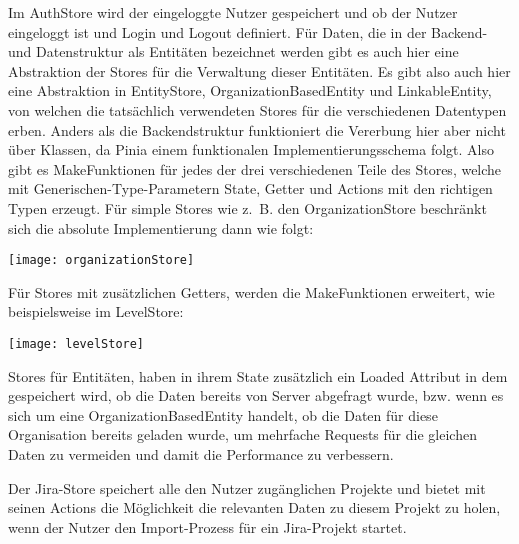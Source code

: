 Im AuthStore wird der eingeloggte Nutzer gespeichert und ob der Nutzer eingeloggt ist und Login und Logout definiert.
Für Daten, die in der Backend- und Datenstruktur als Entitäten bezeichnet werden gibt es auch hier eine Abstraktion der Stores für die Verwaltung dieser Entitäten. Es gibt also auch hier eine Abstraktion in EntityStore, OrganizationBasedEntity und LinkableEntity, von welchen die tatsächlich verwendeten Stores für die verschiedenen Datentypen erben. Anders als die Backendstruktur funktioniert die Vererbung hier aber nicht über Klassen, da Pinia einem funktionalen Implementierungsschema folgt. Also gibt es MakeFunktionen für jedes der drei verschiedenen Teile des Stores, welche mit Generischen-Type-Parametern State, Getter und Actions mit den richtigen Typen erzeugt. Für simple Stores wie z. B. den OrganizationStore beschränkt sich die absolute Implementierung dann wie folgt:

\vspace{20pt}
\begin{center}
    \begin{minipage}{1\linewidth}
        \texttt{[image: organizationStore]}
    \end{minipage}
\end{center}
\vspace{20pt}

Für Stores mit zusätzlichen Getters, werden die MakeFunktionen erweitert, wie beispielsweise im LevelStore:

\vspace{20pt}
\begin{center}
    \begin{minipage}{1\linewidth}
        \texttt{[image: levelStore]}
    \end{minipage}
\end{center}
\vspace{20pt}

Stores für Entitäten, haben in ihrem State zusätzlich ein Loaded Attribut in dem gespeichert wird, ob die Daten bereits von Server abgefragt wurde, bzw. wenn es sich um eine OrganizationBasedEntity handelt, ob die Daten für diese Organisation bereits geladen wurde, um mehrfache Requests für die gleichen Daten zu vermeiden und damit die Performance zu verbessern.

Der Jira-Store speichert alle den Nutzer zugänglichen Projekte und bietet mit seinen Actions die Möglichkeit die relevanten Daten zu diesem Projekt zu holen, wenn der Nutzer den Import-Prozess für ein Jira-Projekt startet.

